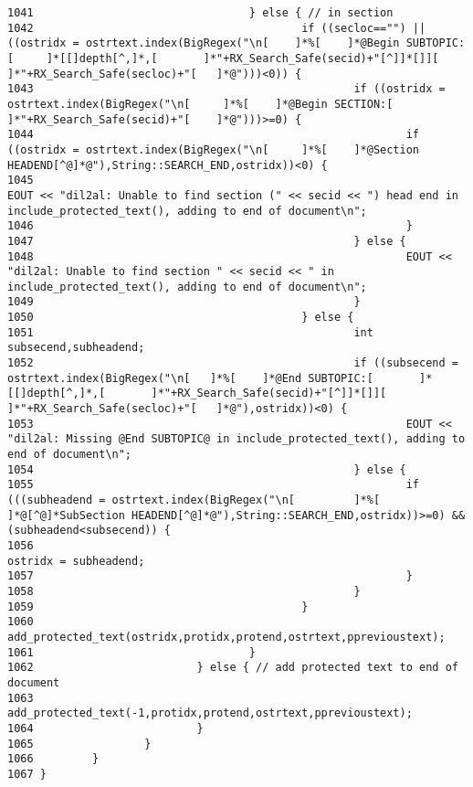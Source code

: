 \begin{verbatim}
1041                                 } else { // in section
1042                                         if ((secloc=="") || ((ostridx = ostrtext.index(BigRegex("\n[    ]*%[    ]*@Begin SUBTOPIC:[     ]*[[]depth[^,]*,[       ]*"+RX_Search_Safe(secid)+"[^]]*[]][    ]*"+RX_Search_Safe(secloc)+"[   ]*@")))<0)) {
1043                                                 if ((ostridx = ostrtext.index(BigRegex("\n[     ]*%[    ]*@Begin SECTION:[      ]*"+RX_Search_Safe(secid)+"[    ]*@")))>=0) {
1044                                                         if ((ostridx = ostrtext.index(BigRegex("\n[     ]*%[    ]*@Section HEADEND[^@]*@"),String::SEARCH_END,ostridx))<0) {
1045                                                                 EOUT << "dil2al: Unable to find section (" << secid << ") head end in include_protected_text(), adding to end of document\n";
1046                                                         }
1047                                                 } else {
1048                                                         EOUT << "dil2al: Unable to find section " << secid << " in include_protected_text(), adding to end of document\n";
1049                                                 }
1050                                         } else {
1051                                                 int subsecend,subheadend;
1052                                                 if ((subsecend = ostrtext.index(BigRegex("\n[   ]*%[    ]*@End SUBTOPIC:[       ]*[[]depth[^,]*,[       ]*"+RX_Search_Safe(secid)+"[^]]*[]][    ]*"+RX_Search_Safe(secloc)+"[   ]*@"),ostridx))<0) {
1053                                                         EOUT << "dil2al: Missing @End SUBTOPIC@ in include_protected_text(), adding to end of document\n";
1054                                                 } else {
1055                                                         if (((subheadend = ostrtext.index(BigRegex("\n[         ]*%[    ]*@[^@]*SubSection HEADEND[^@]*@"),String::SEARCH_END,ostridx))>=0) && (subheadend<subsecend)) {
1056                                                                 ostridx = subheadend;
1057                                                         }
1058                                                 }
1059                                         }
1060                                         add_protected_text(ostridx,protidx,protend,ostrtext,pprevioustext);
1061                                 }
1062                         } else { // add protected text to end of document
1063                                 add_protected_text(-1,protidx,protend,ostrtext,pprevioustext);
1064                         }
1065                 }
1066         }
1067 }
\end{verbatim}\normalsize 
{}
